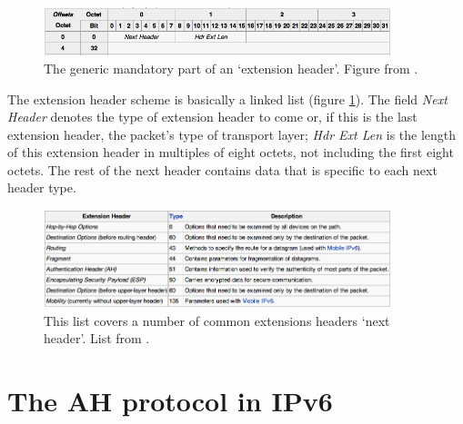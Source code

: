 \documentclass[final,a4paper,twoside,11pt,onecolumn]{report}
\begin{document}
\begin{figure}[here]
   \includegraphics[width=0.9\textwidth]{wiki-ipv6-nextheader}
   \caption{The generic mandatory part of an `extension header'. Figure from \cite{wiki:ipv6_packet}.}
   \label{fig:wiki-ipv6-nextheader}
\end{figure}

The extension header scheme is basically a linked list (figure \ref{fig:wiki-ipv6-nextheader}). The field \emph{Next Header} denotes the type of extension header to come or, if this is the last extension header, the packet's type of transport layer; \emph{Hdr Ext Len} is the length of this extension header in multiples of eight octets, not including the first eight octets. The rest of the next header contains data that is specific to each next header type.

\begin{figure}[h!]
   \includegraphics[width=0.9\textwidth]{wiki-ipv6-listofextensionheaders}
   \caption{This list covers a number of common extensions headers `next header'. List from \cite{wiki:ipv6_packet}.}
   \label{fig:wiki-ipv6-listofextensionheaders}
\end{figure}


\section{The AH protocol in IPv6}
\label{sec:bgah}
\end{document}
